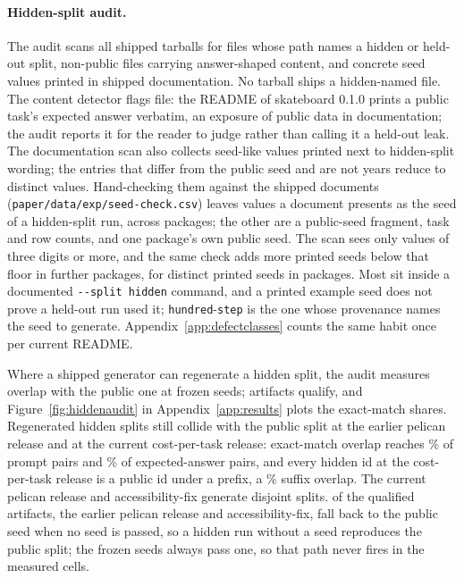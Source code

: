 \paragraph{Hidden-split audit.}
The audit scans all \expAuditArtifacts{} shipped tarballs for files whose path names a hidden or held-out split, non-public files carrying answer-shaped content, and concrete seed values printed in shipped documentation. No tarball ships a hidden-named file. The content detector flags \expAuditLeaksFound{} file: the README of skateboard 0.1.0 prints a public task's expected answer verbatim, an exposure of public data in documentation; the audit reports it for the reader to judge rather than calling it a held-out leak. The documentation scan also collects \expAuditSeedExamples{} seed-like values printed next to hidden-split wording; the \expAuditSeedExamplesOther{} entries that differ from the public seed \suitePublicSeed{} and are not years reduce to \expAuditSeedDistinct{} distinct values. Hand-checking them against the shipped documents (\texttt{paper/data/exp/}\allowbreak\texttt{seed-check.csv}) leaves \expAuditSeedRealDistinct{} values a document presents as the seed of a hidden-split run, across \expAuditSeedRealPkgs{} packages; the other \expAuditSeedNonseed{} are a public-seed fragment, task and row counts, and one package's own public seed. The scan sees only values of three digits or more, and the same check adds \expAuditSeedHandValues{} more printed seeds below that floor in \expAuditSeedHandPkgs{} further packages, for \expAuditSeedTotalDistinct{} distinct printed seeds in \expAuditSeedTotalPkgs{} packages. Most sit inside a documented \texttt{-{}-split hidden} command, and a printed example seed does not prove a held-out run used it; \texttt{hundred}-\allowbreak\texttt{step} is the one whose provenance names the seed to generate. Appendix~\ref{app:defectclasses} counts the same habit once per current README.

Where a shipped generator can regenerate a hidden split, the audit measures overlap with the public one at \expAuditSeeds{} frozen seeds; \expAuditCensusQualified{} artifacts qualify, and Figure~\ref{fig:hiddenaudit} in Appendix~\ref{app:results} plots the exact-match shares. Regenerated hidden splits still collide with the public split at the earlier pelican release and at the current cost-per-task release: exact-match overlap reaches \expAuditMaxPromptOverlapPct\% of prompt pairs and \expAuditMaxExpectedOverlapPct\% of expected-answer pairs, and every hidden id at the cost-per-task release is a public id under a prefix, a \expAuditMaxIdSuffixPct\% suffix overlap. The current pelican release and accessibility-fix generate disjoint splits. \expAuditSeedlessQual{} of the qualified artifacts, the earlier pelican release and accessibility-fix, fall back to the public seed when no seed is passed, so a hidden run without a seed reproduces the public split; the frozen seeds always pass one, so that path never fires in the measured cells.

